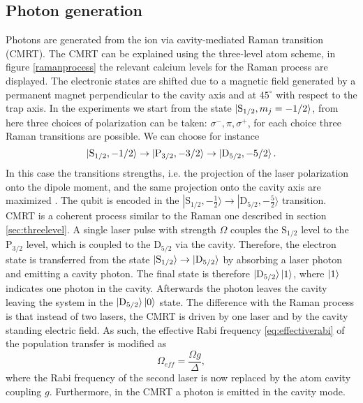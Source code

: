 \subsection{Photon generation}
\label{sec:ramanprocess}
Photons are generated from the ion via cavity-mediated Raman transition (CMRT). The CMRT can be explained using the three-level atom scheme, in figure \ref{ramanprocess} the relevant calcium levels for the Raman process are displayed. The electronic states are shifted due to a magnetic field generated by a permanent magnet perpendicular to the cavity axis and at $45^{\circ}$ with respect to the trap axis. In the experiments we start from the state $\ket{\text{S}_{1/2},m_j = -1/2}$, from here three choices of polarization can be taken: $\sigma^-,\pi,\sigma^+$, for each choice three Raman transitions are possible. We can choose for instance
\begin{equation}
\ket{\text{S}_{1/2},-1/2}\to\ket{\text{P}_{3/2},-3/2} \to \ket{\text{D}_{5/2},-5/2}.
\end{equation}
In this case the transitions strengths, i.e. the projection of the laser polarization onto the dipole moment, and the same projection onto the cavity axis are maximized \cite{stuteinterface}. The qubit is encoded in the $|\text{S}_{1/2},-\frac{1}{2}\rangle \to |\text{D}_{5/2},-\frac{5}{2}\rangle$ transition.\\
CMRT is a coherent process similar to the Raman one described in section \ref{sec:threelevel}. A single laser pulse with strength $\Omega$ couples the $\text{S}_{1/2}$ level to the $\text{P}_{3/2}$ level, which is coupled to the $\text{D}_{5/2}$ via the cavity. Therefore, the electron state is  transferred from the state $\ket{\text{S}_{1/2}} \to \ket{\text{D}_{5/2}}$  by absorbing a laser photon and emitting a cavity photon. The final state is therefore $\ket{\text{D}_{5/2}}\ket{1}$, where $\ket{1}$ indicates one photon in the cavity. Afterwards the photon leaves the cavity leaving the system in the $\ket{\text{D}_{5/2}}\ket{0}$ state.
The difference with the Raman process is that instead of two lasers, the CMRT is driven by one laser and by the cavity standing electric field. As such, the effective Rabi frequency \eqref{eq:effectiverabi} of the population transfer is modified as \cite{Barros2009}
\begin{equation}
\label{omegaeff}
\Omega_{eff} = \frac{\Omega g}{\Delta},
\end{equation}
where the Rabi frequency of the second laser is now replaced by the atom cavity coupling $g$. Furthermore, in the CMRT a photon is emitted in the cavity mode.
